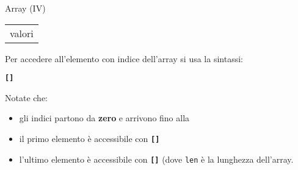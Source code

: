 \begin{frame}{Array (IV)}
\begin{table}[]
\begin{tabular}{cccccccccc}
      \multicolumn{10}{c}{{\color[HTML]{009901} valori}}                                                                                                                                                                                                                                                                                                                                                                                                                                                      
    \end{tabular}
  \end{table}
  
  Per accedere all'elemento con indice \texttt{} dell'array si usa la sintassi:
  \begin{center}
    \texttt{\textbf{[}\textbf{]}}
  \end{center}
  
  Notate che:
  \begin{itemize}
   \item gli indici partono da \alert{\textbf{zero}} e arrivono fino alla 
   \item il primo elemento è accessibile con \texttt{\textbf{[}\textbf{]}}
   \item l'ultimo elemento è accessibile con \texttt{\textbf{[}\textbf{]}} (dove \texttt{len}
	 è la lunghezza dell'array.
  \end{itemize}

\end{frame}

